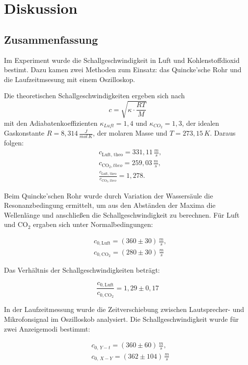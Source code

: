 \chapter{Diskussion}
\label{Disskusion}

\section{Zusammenfassung}

Im Experiment wurde die Schallgeschwindigkeit in Luft und Kohlenstoffdioxid bestimt. Dazu kamen zwei Methoden zum Einsatz: das Quincke'sche Rohr und die Laufzeitmsesung mit einem Oszilloskop. 

Die theoretischen Schallgeschwindigkeiten ergeben sich nach
\[
c = \sqrt{\kappa \cdot \frac{R T}{M}}
\]
mit den Adiabatenkoeffizienten $\kappa_{Luft}=1{,}4$ und $\kappa_{CO_2}=1{,}3$, der idealen Gaskonstante $R = 8{,}314\,\frac{J}{mol\,K}$, der molaren Masse und $T=273{,}15\,K$. Daraus folgen:
\begin{align}
    &\boxed{c_{\text{Luft, theo}} = 331{,}11\,\frac{m}{s}}, \\ 
    &\boxed{c_{\text{CO}_2, theo} = 259{,}03\,\frac{m}{s}}, \\ 
    &\boxed{\frac{c_{\text{Luft, theo}}}{c_{\text{CO}_2, theo}} = 1{,}278.}
\end{align}

Beim Quincke'schen Rohr wurde durch Variation der Wassersäule die Resonanzbedingung ermittelt, um aus den Abständen der Maxima die Wellenlänge und anschließen die Schallgeschwindigkeit zu berechnen. Für Luft und CO$_2$ ergaben sich unter Normalbedingungen:

\begin{align}
    &\boxed{c_{0,\text{Luft}} = (360 \pm 30)\,\frac{m}{s}}, \\ 
    &\boxed{c_{0,\text{CO}_2} = (280 \pm 30)\,\frac{m}{s}}
\end{align}

Das Verhältnis der Schallgeschwindigkeiten beträgt:

\begin{equation}
    \boxed{\frac{c_{0,\text{Luft}}}{c_{0,\text{CO}_2}} = 1{,}29 \pm 0{,}17}
\end{equation}

In der Laufzeitmessung wurde die Zeitverschiebung zwischen Lautsprecher- und Mikrofonsignal im Oszilloskob analysiert. Die Schallgeschwindigkeit wurde für zwei Anzeigemodi bestimmt:

\begin{align}
    &\boxed{c_{0,\,Y\!-\!t} = (360 \pm 60)\,\frac{m}{s}}, \\ 
    &\boxed{c_{0,\,X\!-\!Y} = (362 \pm 104)\,\frac{m}{s}}
\end{align}

